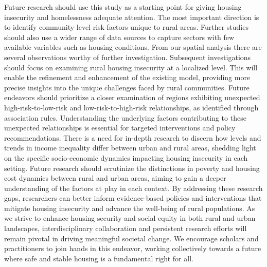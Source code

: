 Future research should use this study as a starting point for giving housing insecurity and homelessness adequate attention. The most important direction is to identify community level risk factors unique to rural areas. Further studies should also use a wider range of data sources to capture sectors with few available variables such as housing conditions. From our spatial analysis there are several observations worthy of further investigation. Subsequent investigations should focus on examining rural housing insecurity at a localized level. This will enable the refinement and enhancement of the existing model, providing more precise insights into the unique challenges faced by rural communities.	Future endeavors should prioritize a closer examination of regions exhibiting unexpected high-risk-to-low-risk and low-risk-to-high-risk relationships, as identified through association rules. Understanding the underlying factors contributing to these unexpected relationships is essential for targeted interventions and policy recommendations. There is a need for in-depth research to discern how levels and trends in income inequality differ between urban and rural areas, shedding light on the specific socio-economic dynamics impacting housing insecurity in each setting. Future research should scrutinize the distinctions in poverty and housing cost dynamics between rural and urban areas, aiming to gain a deeper understanding of the factors at play in each context. By addressing these research gaps, researchers can better inform evidence-based policies and interventions that mitigate housing insecurity and advance the well-being of rural populations. As we strive to enhance housing security and social equity in both rural and urban landscapes, interdisciplinary collaboration and persistent research efforts will remain pivotal in driving meaningful societal change. We encourage scholars and practitioners to join hands in this endeavor, working collectively towards a future where safe and stable housing is a fundamental right for all.  
\endinput
